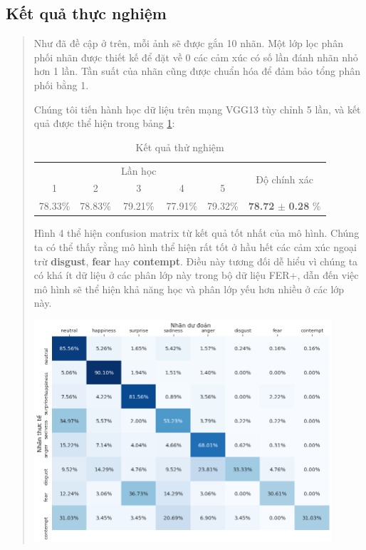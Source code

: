 \documentclass{article}
\begin{document}
\subsection{Kết quả thực nghiệm}
\begin{quote}
   Như đã đề cập ở trên, mỗi ảnh sẽ được gắn 10 nhãn. Một lớp lọc phân phối nhãn được thiết kế để đặt về 0 các cảm xúc có số lần đánh nhãn nhỏ hơn 1 lần. Tần suất của nhãn cũng được chuẩn hóa để đảm bảo tổng phân phối bằng 1.

   Chúng tôi tiến hành học dữ liệu trên mạng VGG13 tùy chỉnh 5 lần, và kết quả được thể hiện trong bảng \ref{table:testResult}:

   \begin{table}[H]
      \centering
      \begin{tabular}{|p{2cm}p{2cm}p{2cm}p{2cm}p{2cm}|p{3cm}|}
      \hline
                                    &                              & \multicolumn{1}{c}{Lần học}       &                               &                                   & \multicolumn{1}{c|}{\multirow{2}{*}{Độ chính xác}}              \\ \cline{1-5}
      \multicolumn{1}{|c|}{1}       & \multicolumn{1}{c|}{2}       & \multicolumn{1}{c|}{3}            & \multicolumn{1}{c|}{4}        & \multicolumn{1}{c|}{5}            &                                                                 \\ \hline
      \multicolumn{1}{|c|}{78.33\%} & \multicolumn{1}{c|}{78.83\%} & \multicolumn{1}{c|}{79.21\%}      & \multicolumn{1}{c|}{77.91\%}  & \multicolumn{1}{c|}{79.32\%}      & \multicolumn{1}{c|}{\textbf{78.72} $\pm$ \textbf{0.28} \%}      \\ \hline
      \end{tabular}
      \caption{Kết quả thử nghiệm}
      \label{table:testResult}
   \end{table}

   Hình 4 thể hiện confusion matrix từ kết quả tốt nhất của mô hình. Chúng ta có thể thấy rằng mô hình thể hiện rất tốt ở hầu hết các cảm xúc ngoại trừ \textbf{disgust}, \textbf{fear} hay \textbf{contempt}. Điều này tương đối dễ hiểu vì chúng ta có khá ít dữ liệu ở các phân lớp này trong bộ dữ liệu FER+, dẫn đến việc mô hình sẽ thể hiện khả năng học và phân lớp yếu hơn nhiều ở các lớp này.

   \centering
   \includegraphics[width=0.90\textwidth]{confuse.png}
\end{quote}
\end{document}
